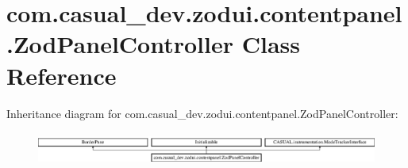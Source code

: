 \hypertarget{classcom_1_1casual__dev_1_1zodui_1_1contentpanel_1_1_zod_panel_controller}{\section{com.\-casual\-\_\-dev.\-zodui.\-contentpanel.\-Zod\-Panel\-Controller Class Reference}
\label{classcom_1_1casual__dev_1_1zodui_1_1contentpanel_1_1_zod_panel_controller}
}
Inheritance diagram for com.\-casual\-\_\-dev.\-zodui.\-contentpanel.\-Zod\-Panel\-Controller\-:\begin{figure}[H]
\begin{center}
\leavevmode
\includegraphics[height=1.107814cm]{classcom_1_1casual__dev_1_1zodui_1_1contentpanel_1_1_zod_panel_controller}
\end{center}
\end{figure}
